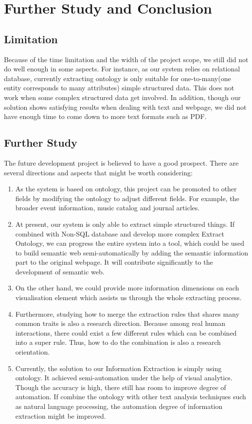 \chapter{Further Study and Conclusion}\label{chapter:con}

\section{Limitation}
Because of the time limitation and the width of the project scope, we still did not do well enough in some aspects. For instance, as our system relies on relational database, currently extracting ontology is only suitable for one-to-many(one entity corresponds to many attributes) simple structured data. This does not work when some complex structured data get involved. In addition, though our solution shows satisfying results when dealing with text and webpage, we did not have enough time to come down to more text formats such as PDF.

\section{Further Study}
The future development project is believed to have a good prospect. There are several directions and aspects that might be worth considering:
\begin{enumerate}
  \item As the system is based on ontology, this project can be promoted to other fields by modifying the ontology to adjust different fields. For example, the broader event information, music catalog and journal articles.
  \item At present, our system is only able to extract simple structured things. If combined with Non-SQL database and develop more complex Extract Ontology, we can progress the entire system into a tool, which could be used to build semantic web semi-automatically by adding the semantic information part to the original webpage. It will contribute significantly to the development of semantic web.
  \item On the other hand, we could provide more information dimensions on each visualisation element which assists us through the whole extracting process.
  \item Furthermore, studying how to merge the extraction rules that shares many common traits is also a research direction. Because among real human interactions, there could exist a few different rules which can be combined into a super rule. Thus, how to do the combination is also a research orientation.
  \item Currently, the solution to our Information Extraction is simply using ontology. It achieved semi-automation under the help of visual analytics. Though the accuracy is high, there still has room to improve degree of automation. If combine the ontology with other text analysis techniques such as natural language processing, the automation degree of information extraction might be improved.

\end{enumerate}

